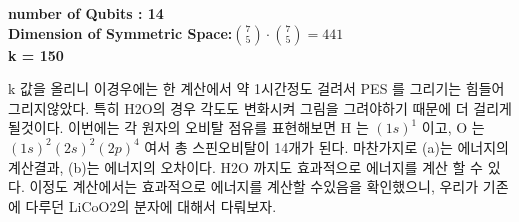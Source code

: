 \documentclass[11pt]{article}
\begin{document}
\begin{center}
\textbf{number of Qubits : 14}\\
\textbf{Dimension of Symmetric Space:\(\binom{7}{5}\cdot\binom{7}{5}=441\)}\\
\textbf{k = 150}
\end{center}
k 값을 올리니 이경우에는 한 계산에서 약 1시간정도 걸려서 PES 를 그리기는 힘들어 그리지않았다. 특히 H2O의 경우 각도도 변화시켜 그림을 그려야하기 때문에 더 걸리게될것이다. 
이번에는 각 원자의 오비탈 점유를 표현해보면 H 는 \((1s)^{1}\) 이고, O 는 \((1s)^{2}(2s)^{2}(2p)^{4}\) 여서 총 스핀오비탈이 14개가 된다. 
마찬가지로 (a)는 에너지의 계산결과, (b)는 에너지의 오차이다. 
H2O 까지도 효과적으로 에너지를 계산 할 수 있다. 이정도 계산에서는 효과적으로 에너지를 계산할 수있음을 확인했으니, 우리가 기존에 다루던 LiCoO2의 분자에 대해서 다뤄보자.
\end{document}
